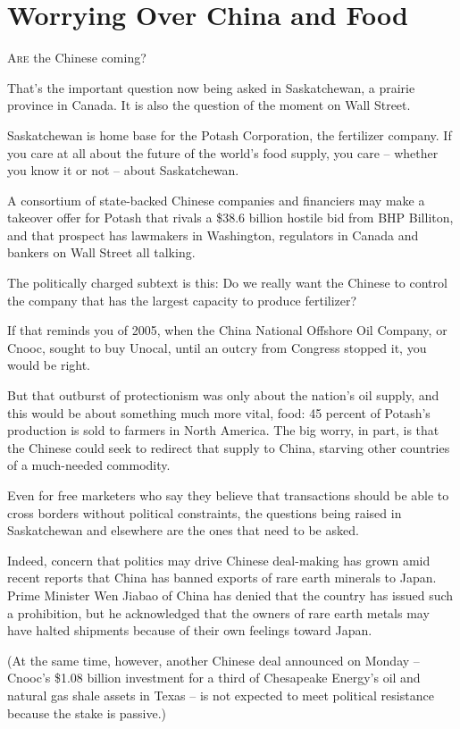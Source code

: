 ﻿\documentclass[12pt]{article}
\begin{document}
\section{Worrying Over China and Food}

\lettrine{A}{re} the Chinese coming?

That's the important question now being asked in Saskatchewan, a prairie province in Canada. It is
also the question of the moment on Wall Street.

Saskatchewan is home base for the Potash Corporation, the fertilizer company. If you care at all
about the future of the world's food supply, you care -- whether you know it or not -- about
Saskatchewan.

A consortium of state-backed Chinese companies and financiers may make a takeover offer for Potash
that rivals a \$38.6 billion hostile bid from BHP Billiton, and that prospect has lawmakers in
Washington, regulators in Canada and bankers on Wall Street all talking.

The politically charged subtext is this: Do we really want the Chinese to control the company that
has the largest capacity to produce fertilizer?

If that reminds you of 2005, when the China National Offshore Oil Company, or Cnooc, sought to buy
Unocal, until an outcry from Congress stopped it, you would be right.

But that outburst of protectionism was only about the nation's oil supply, and this would be about
something much more vital, food: 45 percent of Potash's production is sold to farmers in North
America. The big worry, in part, is that the Chinese could seek to redirect that supply to China,
starving other countries of a much-needed commodity.

Even for free marketers who say they believe that transactions should be able to cross borders
without political constraints, the questions being raised in Saskatchewan and elsewhere are the ones
that need to be asked.

Indeed, concern that politics may drive Chinese deal-making has grown amid recent reports that China
has banned exports of rare earth minerals to Japan. Prime Minister Wen Jiabao of China has denied
that the country has issued such a prohibition, but he acknowledged that the owners of rare earth
metals may have halted shipments because of their own feelings toward Japan.

(At the same time, however, another Chinese deal announced on Monday -- Cnooc's \$1.08 billion
investment for a third of Chesapeake Energy's oil and natural gas shale assets in Texas -- is not
expected to meet political resistance because the stake is passive.)
\end{document}
